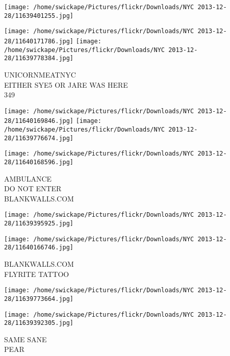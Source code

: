 \documentclass[10pt,letterpaper]{article}
\begin{document}
\texttt{[image: /home/swickape/Pictures/flickr/Downloads/NYC 2013-12-28/11639401255.jpg]}

\vspace{0.25in}
\texttt{[image: /home/swickape/Pictures/flickr/Downloads/NYC 2013-12-28/11640171786.jpg]}
\texttt{[image: /home/swickape/Pictures/flickr/Downloads/NYC 2013-12-28/11639778384.jpg]}

UNICORNMEATNYC\\
EITHER SYE5 OR JARE WAS HERE\\
349\\
\pagebreak

\texttt{[image: /home/swickape/Pictures/flickr/Downloads/NYC 2013-12-28/11640169846.jpg]}
\texttt{[image: /home/swickape/Pictures/flickr/Downloads/NYC 2013-12-28/11639776674.jpg]}

\vspace{0.25in}
\texttt{[image: /home/swickape/Pictures/flickr/Downloads/NYC 2013-12-28/11640168596.jpg]}

AMBULANCE\\
DO NOT ENTER\\
BLANKWALLS.COM\\
\pagebreak

\texttt{[image: /home/swickape/Pictures/flickr/Downloads/NYC 2013-12-28/11639395925.jpg]}

\vspace{0.25in}
\texttt{[image: /home/swickape/Pictures/flickr/Downloads/NYC 2013-12-28/11640166746.jpg]}

BLANKWALLS.COM\\
FLYRITE TATTOO\\
\pagebreak

\texttt{[image: /home/swickape/Pictures/flickr/Downloads/NYC 2013-12-28/11639773664.jpg]}

\vspace{0.25in}
\texttt{[image: /home/swickape/Pictures/flickr/Downloads/NYC 2013-12-28/11639392305.jpg]}

SAME SANE\\
PEAR\\
\pagebreak
\end{document}
